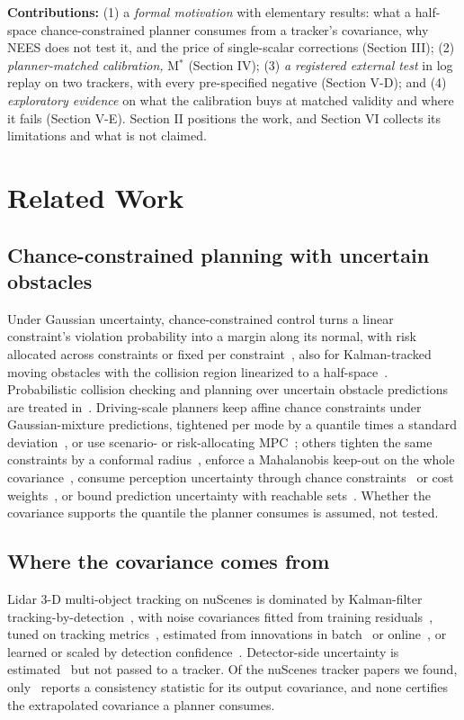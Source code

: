\documentclass{ieeeaccess}
\begin{document}
\textbf{Contributions:} (1) a \emph{formal motivation} with elementary results: what a half-space chance-constrained planner consumes from a tracker's covariance, why NEES does not test it, and the price of single-scalar corrections (Section III); (2) \emph{planner-matched calibration,} M$^{*}$ (Section IV); (3) \emph{a registered external test} in log replay on two trackers, with every pre-specified negative (Section V-D); and (4) \emph{exploratory evidence} on what the calibration buys at matched validity and where it fails (Section V-E). Section II positions the work, and Section VI collects its limitations and what is not claimed.

\section{Related Work}
\subsection{Chance-constrained planning with uncertain obstacles}
Under Gaussian uncertainty, chance-constrained control turns a linear constraint's violation probability into a margin along its normal, with risk allocated across constraints or fixed per constraint~\cite{Blackmore2011,Ono2008}, also for Kalman-tracked moving obstacles with the collision region linearized to a half-space~\cite{Zhu2019}. Probabilistic collision checking and planning over uncertain obstacle predictions are treated in~\cite{DuToit2011,Hardy2013}. Driving-scale planners keep affine chance constraints under Gaussian-mixture predictions, tightened per mode by a quantile times a standard deviation~\cite{Nair2025,Ren2025}, or use scenario- or risk-allocating MPC~\cite{deGroot2025,Mustafa2023}; others tighten the same constraints by a conformal radius~\cite{Lindemann2023}, enforce a Mahalanobis keep-out on the whole covariance~\cite{Shah2026,Mohamed2025,Pouria2026}, consume perception uncertainty through chance constraints~\cite{Li2024} or cost weights~\cite{Shi2026}, or bound prediction uncertainty with reachable sets~\cite{Guo2025}. Whether the covariance supports the quantile the planner consumes is assumed, not tested.

\subsection{Where the covariance comes from}
Lidar 3-D multi-object tracking on nuScenes is dominated by Kalman-filter tracking-by-detection~\cite{Weng2020,Chiu2020,Li2023,Osterburg2026}, with noise covariances fitted from training residuals~\cite{Chiu2020}, tuned on tracking metrics~\cite{Osterburg2026}, estimated from innovations in batch~\cite{Mehra1970,Zhang2020} or online~\cite{Sarkka2009,Huang2018,Jiang2024}, or learned or scaled by detection confidence~\cite{Ulreich2024,LearnTrack2026}. Detector-side uncertainty is estimated~\cite{Feng2018,Meyer2020,Pan2020} but not passed to a tracker. Of the nuScenes tracker papers we found, only~\cite{Osterburg2026} reports a consistency statistic for its output covariance, and none certifies the extrapolated covariance a planner consumes.
\end{document}
